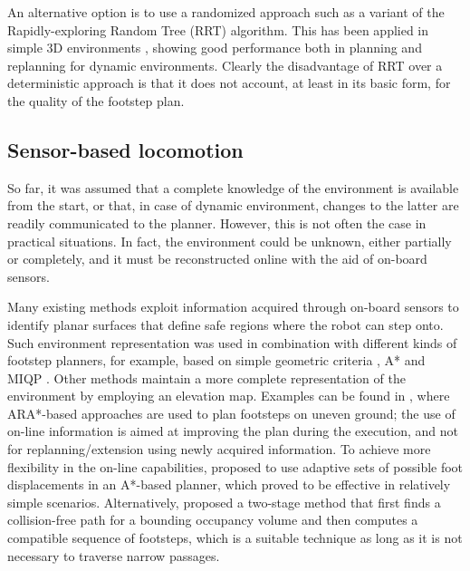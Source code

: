 An alternative option is to use a randomized approach such as a variant of the Rapidly-exploring Random Tree (RRT) algorithm. 
This has been applied in simple 3D environments \cite{Liu2012IROS}, showing good performance both in planning and replanning for dynamic environments. Clearly the disadvantage of RRT over a deterministic approach is that it does not account, at least in its basic form, for the quality of the footstep plan.

\subsection{Sensor-based locomotion}
So far, it was assumed that a complete knowledge of the environment is available from the start, or that, in case of dynamic environment, changes to the latter are readily communicated to the planner. However, this is not often the case in practical situations. In fact, the environment could be unknown, either partially or completely, and it must be reconstructed online with the aid of on-board sensors.

Many existing methods exploit information acquired through on-board sensors to identify planar surfaces that define safe regions where the robot can step onto.
Such environment representation was used in combination with different kinds of footstep planners, for example, based on simple geometric criteria \cite{Okada2005ICRA}, A* \cite{Chestnutt2009IROS} and MIQP \cite{Fallon2015Humanoids}.   
Other methods maintain a more complete representation of the environment by employing an elevation map.
Examples can be found in \cite{Maier2013IROS, Stumpf2014Humanoids}, where ARA*-based approaches are used to plan footsteps on uneven ground; the use of on-line information is aimed at improving the plan during the execution, and not for replanning/extension using newly acquired information.
To achieve more flexibility in the on-line capabilities, \cite{Karkowski2016Humanoids} proposed to use adaptive sets of possible foot displacements in an A*-based planner, which proved to be effective in relatively simple scenarios. Alternatively, \cite{Yamamoto2021AdvancedRobotics} proposed a two-stage method that first finds a collision-free path for a bounding occupancy volume and then computes a compatible sequence of footsteps, which is a suitable technique as long as it is not necessary to traverse narrow passages.

